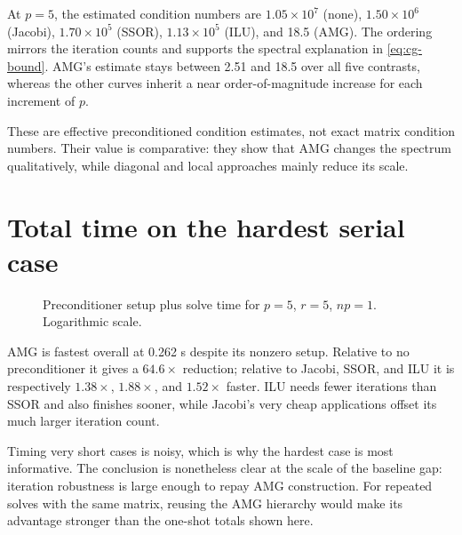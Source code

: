 \documentclass[10pt,a4paper]{article}
\begin{document}
At $p=5$, the estimated condition numbers are $1.05\times10^7$ (none), $1.50\times10^6$
(Jacobi), $1.70\times10^5$ (SSOR), $1.13\times10^5$ (ILU), and 18.5 (AMG). The ordering mirrors
the iteration counts and supports the spectral explanation in \cref{eq:cg-bound}. AMG's estimate
stays between 2.51 and 18.5 over all five contrasts, whereas the other curves inherit a near
order-of-magnitude increase for each increment of $p$.

These are effective preconditioned condition estimates, not exact matrix condition numbers. Their
value is comparative: they show that AMG changes the spectrum qualitatively, while diagonal and
local approaches mainly reduce its scale.

\newpage
\section{Total time on the hardest serial case}
\begin{figure}[h]
\centering
{}
\caption{Preconditioner setup plus solve time for $p=5$, $r=5$, $np=1$. Logarithmic scale.}
\label{fig:serialtime}
\end{figure}

AMG is fastest overall at 0.262 s despite its nonzero setup. Relative to no preconditioner it gives
a $64.6\times$ reduction; relative to Jacobi, SSOR, and ILU it is respectively $1.38\times$,
$1.88\times$, and $1.52\times$ faster. ILU needs fewer iterations than SSOR and also finishes
sooner, while Jacobi's very cheap applications offset its much larger iteration count.

Timing very short cases is noisy, which is why the hardest case is most informative. The conclusion
is nonetheless clear at the scale of the baseline gap: iteration robustness is large enough to repay
AMG construction. For repeated solves with the same matrix, reusing the AMG hierarchy would make
its advantage stronger than the one-shot totals shown here.
\end{document}
